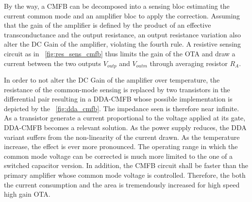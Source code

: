 By the way, a CMFB can be decomposed into a sensing bloc estimating the current common mode and an amplifier bloc to apply the correction. Assuming that the gain of the amplifier is defined by the product of an effective transconductance and the output resistance, an output resistance variation also alter the DC Gain of the amplifier, violating the fourth rule. A resistive sensing circuit as in \figurename~\ref{fig:res_sens_cmfb} thus limits the gain of the OTA and draw a current between the two outputs \(V_{outp}\) and \(V_{outm}\) through averaging resistor \(R_A \). 

In order to not alter the DC Gain of the amplifier over temperature, the resistance of the common-mode sensing is replaced by two transistors in the differential pair resulting in a DDA-CMFB whose possible implementation is depicted by the \figurename~\ref{fig:dda_cmfb}. The impedance seen is therefore near infinite. As a transistor generate a current proportional to the voltage applied at its gate, DDA-CMFB becomes a relevant solution. As the power supply reduces, the DDA variant suffers from the non-linearity of the current drawn. As the temperature increase, the effect is ever more pronounced. The operating range in which the common mode voltage can be corrected is much more limited to the one of a switched capacitor version. In addition, the CMFB circuit shall be faster than the primary amplifier whose common mode voltage is controlled. Therefore, the both the current consumption and the area is tremendously increased for high speed high gain OTA\@.

